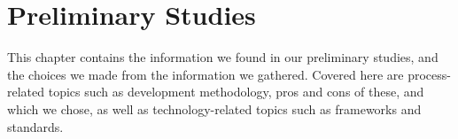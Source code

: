 \chapter{Preliminary Studies}
This chapter contains the information we found in our preliminary studies, and the choices we made from the information we gathered. Covered here are process-related topics such as development methodology, pros and cons of these, and which we chose, as well as technology-related topics such as frameworks and standards.
\newpage



